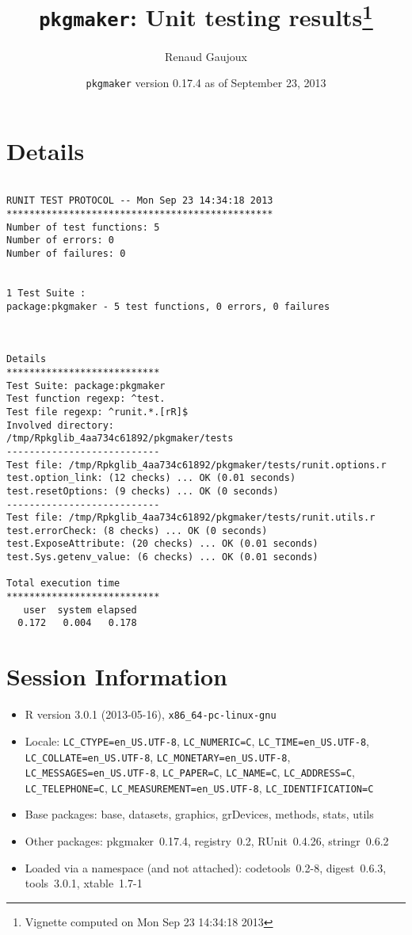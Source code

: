 \documentclass[10pt]{article}\usepackage[]{graphicx}\usepackage[]{color}
\author{Renaud Gaujoux}
\title{\texttt{pkgmaker}: Unit testing results\footnote{Vignette computed  on Mon Sep 23 14:34:18 2013}}
\date{\texttt{pkgmaker} version 0.17.4 as of September 23, 2013}
\begin{document}
\maketitle

\section{Details}
\begin{verbatim}

RUNIT TEST PROTOCOL -- Mon Sep 23 14:34:18 2013 
*********************************************** 
Number of test functions: 5 
Number of errors: 0 
Number of failures: 0 

 
1 Test Suite : 
package:pkgmaker - 5 test functions, 0 errors, 0 failures



Details 
*************************** 
Test Suite: package:pkgmaker 
Test function regexp: ^test. 
Test file regexp: ^runit.*.[rR]$ 
Involved directory: 
/tmp/Rpkglib_4aa734c61892/pkgmaker/tests 
--------------------------- 
Test file: /tmp/Rpkglib_4aa734c61892/pkgmaker/tests/runit.options.r 
test.option_link: (12 checks) ... OK (0.01 seconds)
test.resetOptions: (9 checks) ... OK (0 seconds)
--------------------------- 
Test file: /tmp/Rpkglib_4aa734c61892/pkgmaker/tests/runit.utils.r 
test.errorCheck: (8 checks) ... OK (0 seconds)
test.ExposeAttribute: (20 checks) ... OK (0.01 seconds)
test.Sys.getenv_value: (6 checks) ... OK (0.01 seconds)

Total execution time
***************************
   user  system elapsed 
  0.172   0.004   0.178 

\end{verbatim}

\section*{Session Information}
\begin{itemize}\raggedright
  \item R version 3.0.1 (2013-05-16), \verb|x86_64-pc-linux-gnu|
  \item Locale: \verb|LC_CTYPE=en_US.UTF-8|, \verb|LC_NUMERIC=C|, \verb|LC_TIME=en_US.UTF-8|, \verb|LC_COLLATE=en_US.UTF-8|, \verb|LC_MONETARY=en_US.UTF-8|, \verb|LC_MESSAGES=en_US.UTF-8|, \verb|LC_PAPER=C|, \verb|LC_NAME=C|, \verb|LC_ADDRESS=C|, \verb|LC_TELEPHONE=C|, \verb|LC_MEASUREMENT=en_US.UTF-8|, \verb|LC_IDENTIFICATION=C|
  \item Base packages: base, datasets, graphics, grDevices, methods,
    stats, utils
  \item Other packages: pkgmaker~0.17.4, registry~0.2, RUnit~0.4.26,
    stringr~0.6.2
  \item Loaded via a namespace (and not attached): codetools~0.2-8,
    digest~0.6.3, tools~3.0.1, xtable~1.7-1
\end{itemize}
\end{document}
